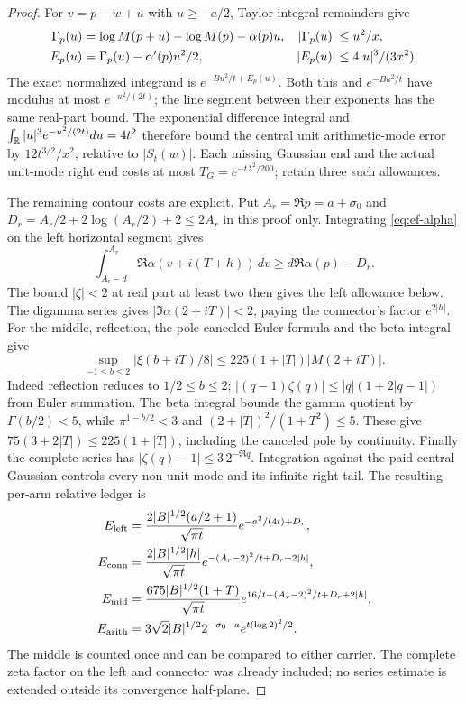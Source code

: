 \begin{proof}
For $v=p-w+u$ with $u\ge-a/2$, Taylor integral remainders give
\begin{align}
 \Gamma_p(u)&=\log M(p+u)-\log M(p)-\alpha(p)u,&
 |\Gamma_p(u)|&\le u^2/x,\notag\\
 E_p(u)&=\Gamma_p(u)-\alpha'(p)u^2/2,&
 |E_p(u)|&\le4|u|^3/(3x^2).
 \label{eq:ef-taylor}
\end{align}
The exact normalized integrand is $e^{-Bu^2/t+E_p(u)}$.
Both this and $e^{-Bu^2/t}$ have modulus at most $e^{-u^2/(2t)}$;
the line segment between their exponents has the same real-part bound.
The exponential difference integral and
$\int_\mathbb R|u|^3e^{-u^2/(2t)}du=4t^2$ therefore bound the central unit
arithmetic-mode error by $12t^{3/2}/x^2$, relative to $|S_t(w)|$.
Each missing Gaussian end and the actual unit-mode right end costs
at most $T_G=e^{-t\lambda^2/200}$; retain three such allowances.

The remaining contour costs are explicit. Put $A_r=\Re p=a+\sigma_0$
and $D_r=A_r/2+2\log(A_r/2)+2\le2A_r$ in this proof only.
Integrating \eqref{eq:ef-alpha} on the left horizontal segment gives
\[
 \int_{A_r-d}^{A_r}\Re\alpha(v+i(T+h))\,dv
                      \ge d\Re\alpha(p)-D_r.
\]
The bound $|\zeta|<2$ at real part at least two then gives the left
allowance below. The digamma series \cite{DLMFDigammaSeries2026} gives
$|\Im\alpha(2+iT)|<2$, paying the connector's factor $e^{2|h|}$.
For the middle, reflection, the pole-canceled Euler formula
\cite{DLMFZetaOuter2026} and the beta integral \cite{DLMFBeta2026} give
\begin{equation}
 \sup_{-1\le b\le2}|\xi(b+iT)/8|
                   \le225(1+|T|)|M(2+iT)|.
 \label{eq:ef-middle-bound}
\end{equation}
Indeed reflection reduces to $1/2\le b\le2$;
$|(q-1)\zeta(q)|\le|q|(1+2|q-1|)$ from Euler summation.
The beta integral bounds the gamma quotient by $\Gamma(b/2)<5$,
while $\pi^{1-b/2}<3$ and
$(2+|T|)^2/(1+T^2)\le5$. These give
$75(3+2|T|)\le225(1+|T|)$, including the canceled pole by continuity.
Finally the complete series has $|\zeta(q)-1|\le3\,2^{-\Re q}$.
Integration against the paid central Gaussian controls every non-unit
mode and its infinite right tail. The resulting per-arm relative ledger is
\begin{align}
 E_{\rm left}&=\frac{2|B|^{1/2}(a/2+1)}{\sqrt{\pi t}}
                                e^{-a^2/(4t)+D_r},\notag\\
 E_{\rm conn}&=\frac{2|B|^{1/2}|h|}{\sqrt{\pi t}}
                         e^{-(A_r-2)^2/t+D_r+2|h|},\notag\\
 E_{\rm mid}&=\frac{675|B|^{1/2}(1+T)}{\sqrt{\pi t}}
                         e^{16/t-(A_r-2)^2/t+D_r+2|h|},\notag\\
 E_{\rm arith}&=3\sqrt2|B|^{1/2}2^{-\sigma_0-a}e^{t(\log2)^2/2}.
 \label{eq:ef-paid-ledger}
\end{align}
The middle is counted once and can be compared to either carrier.
The complete zeta factor on the left and connector was already included;
no series estimate is extended outside its convergence half-plane.


\end{proof}
